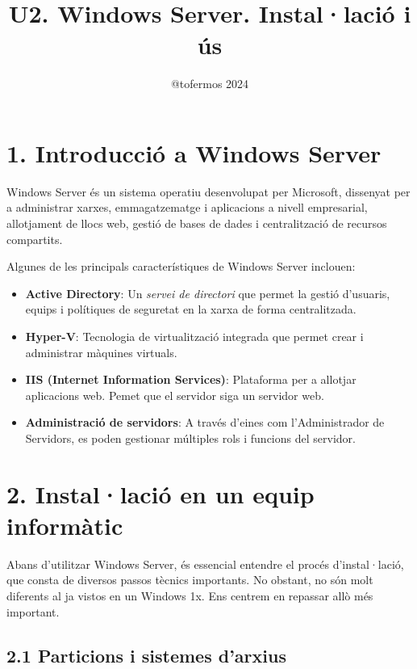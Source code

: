 \documentclass[
  a4paper,
]{article}
\title{U2. Windows Server. Instal·lació i ús}
\author{@tofermos 2024}
\date{}
\begin{document}
\maketitle

{
\setcounter{tocdepth}{2}
\tableofcontents
}
\newpage
\renewcommand\tablename{Tabla}

\section{1. Introducció a Windows
Server}\label{introducciuxf3-a-windows-server}

Windows Server és un sistema operatiu desenvolupat per Microsoft,
dissenyat per a administrar xarxes, emmagatzematge i aplicacions a
nivell empresarial, allotjament de llocs web, gestió de bases de dades i
centralització de recursos compartits.

Algunes de les principals característiques de Windows Server inclouen:

\begin{itemize}
\item
  \textbf{Active Directory}: Un \emph{servei de directori} que permet la
  gestió d'usuaris, equips i polítiques de seguretat en la xarxa de
  forma centralitzada.
\item
  \textbf{Hyper-V}: Tecnologia de virtualització integrada que permet
  crear i administrar màquines virtuals.
\item
  \textbf{IIS (Internet Information Services)}: Plataforma per a
  allotjar aplicacions web. Pemet que el servidor siga un servidor web.
\item
  \textbf{Administració de servidors}: A través d'eines com
  l'Administrador de Servidors, es poden gestionar múltiples rols i
  funcions del servidor.
\end{itemize}

\section{2. Instal·lació en un equip
informàtic}\label{installaciuxf3-en-un-equip-informuxe0tic}

Abans d'utilitzar Windows Server, és essencial entendre el procés
d'instal·lació, que consta de diversos passos tècnics importants. No
obstant, no són molt diferents al ja vistos en un Windows 1x. Ens
centrem en repassar allò més important.

\subsection{2.1 Particions i sistemes
d'arxius}\label{particions-i-sistemes-darxius}
\end{document}
